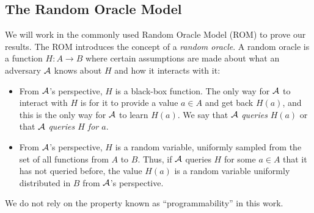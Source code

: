 
\subsection{The Random Oracle Model}

We will work in the commonly used Random Oracle Model (ROM) to prove our results. The ROM introduces the concept of a \emph{random oracle}. A random oracle is a function $H : A \to B$ where certain assumptions are made about what an adversary $\mathcal{A}$ knows about $H$ and how it interacts with it:
\begin{itemize}
	\item From $\mathcal{A}$'s perspective, $H$ is a black-box function. The only way for $\mathcal{A}$ to interact with $H$ is for it to provide a value $a \in A$ and get back $H(a)$, and this is the only way for $\mathcal{A}$ to learn $H(a)$. We say that $\mathcal{A}$ \emph{queries} $H(a)$ or that $\mathcal{A}$ \emph{queries $H$ for $a$}.
	\item From $\mathcal{A}$'s perspective, $H$ is a random variable, uniformly sampled from the set of all functions from $A$ to $B$. Thus, if $\mathcal{A}$ queries $H$ for some $a \in A$ that it has not queried before, the value $H(a)$ is a random variable uniformly distributed in $B$ from $\mathcal{A}$'s perspective.
\end{itemize}
We do not rely on the property known as ``programmability'' in this work.
